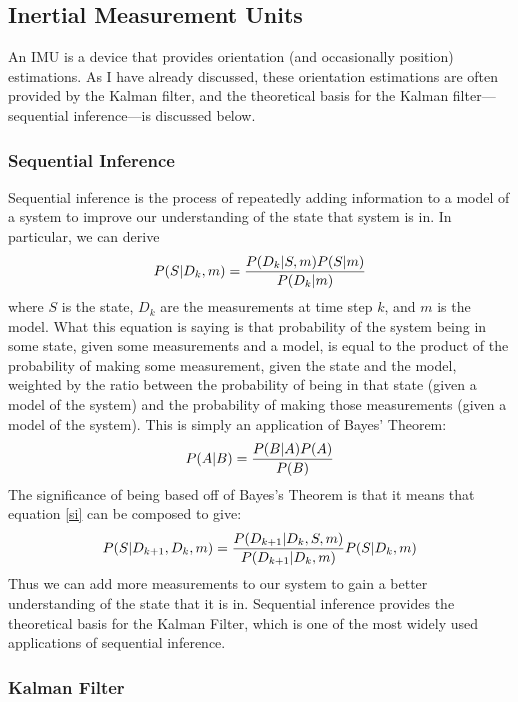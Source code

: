 \documentclass[12pt]{article}
\begin{document}
\subsection{Inertial Measurement Units}

An IMU is a device that provides orientation (and occasionally position) estimations. As I have already discussed, these orientation estimations are often provided by the Kalman filter, and the theoretical basis for the Kalman filter---sequential inference---is discussed below.

\subsubsection{Sequential Inference}

Sequential inference \cite{morrison_2016} is the process of repeatedly adding information to a model of a system to improve our understanding of the state that system is in. In particular, we can derive
\begin{equation}
	\label{si}
	P(S | D_k, m) = {P(D_k | S, m) P(S | m) \over P(D_k | m)}
\end{equation}
where $S$ is the state, $D_k$ are the measurements at time step $k$, and $m$ is the model. What this equation is saying is that probability of the system being in some state, given some measurements and a model, is equal to the product of the probability of making some measurement, given the state and the model, weighted by the ratio between the probability of being in that state (given a model of the system) and the probability of making those measurements (given a model of the system). This is simply an application of Bayes' Theorem:
\begin{equation}
	P(A | B) = {P(B|A) P(A) \over P(B)}
\end{equation}
The significance of being based off of Bayes's Theorem is that it means that equation \ref{si} can be composed to give:
\begin{equation}
	P(S|D_{k+1},D_k,m) = {P(D_{k+1}|D_k,S,m) \over P(D_{k+1}|D_k,m)} P(S | D_k, m)
\end{equation}
Thus we can add more measurements to our system to gain a better understanding of the state that it is in. Sequential inference provides the theoretical basis for the Kalman Filter, which is one of the most widely used applications of sequential inference.

\subsubsection{Kalman Filter}
\end{document}
